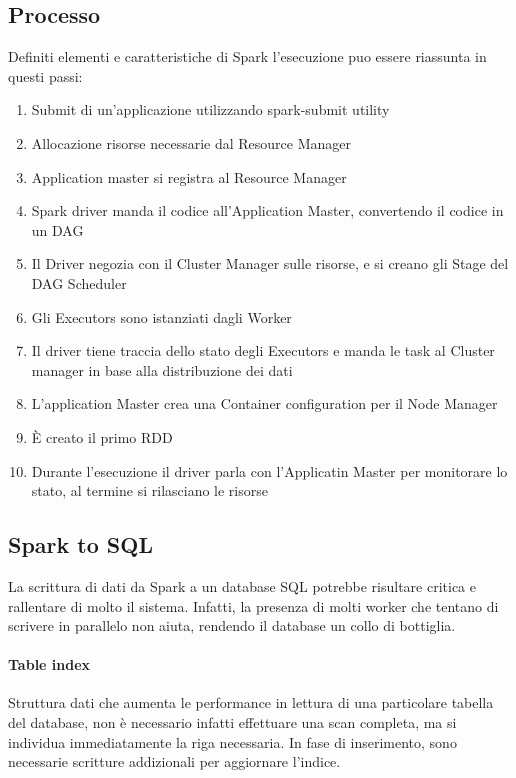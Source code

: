 \subsection{Processo}
Definiti elementi e caratteristiche di Spark l'esecuzione puo essere riassunta 
in questi passi:
\begin{enumerate}
    \item Submit di un'applicazione utilizzando spark-submit utility
    \item Allocazione risorse necessarie dal Resource Manager
    \item Application master si registra al Resource Manager
    \item Spark driver manda il codice all'Application Master, convertendo il codice
    in un DAG
    \item Il Driver negozia con il Cluster Manager sulle risorse, e si creano gli Stage del 
    DAG Scheduler
    \item Gli Executors sono istanziati dagli Worker
    \item Il driver tiene traccia dello stato degli Executors e manda le task al 
    Cluster manager in base alla distribuzione dei dati
    \item L'application Master crea una Container configuration per il Node Manager
    \item È creato il primo RDD
    \item Durante l'esecuzione il driver parla con l'Applicatin Master per monitorare
    lo stato, al termine si rilasciano le risorse
\end{enumerate}

\subsection{Spark to SQL}
La scrittura di dati da Spark a un database SQL potrebbe risultare critica e 
rallentare di molto il sistema. Infatti, la presenza di molti worker che tentano
di scrivere in parallelo non aiuta, rendendo il database un collo di bottiglia.

\paragraph{Table index}
Struttura dati che aumenta le performance in lettura di una particolare tabella del 
database, non è necessario infatti effettuare una scan completa, ma si individua 
immediatamente la riga necessaria.
In fase di inserimento, sono necessarie scritture addizionali per aggiornare l'indice.

